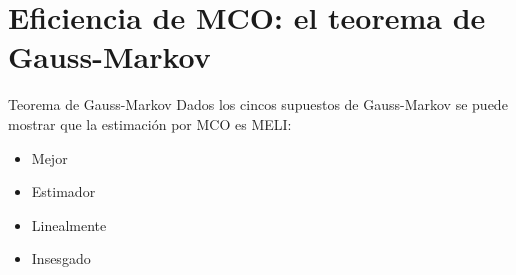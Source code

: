 \section{Eficiencia de MCO: el teorema de Gauss-Markov}
\begin{frame}{Teorema de Gauss-Markov} 
	Dados los cincos supuestos de Gauss-Markov se puede mostrar que la estimación por MCO es MELI:
	\begin{itemize}
		\item Mejor
		\item Estimador
		\item Linealmente 
		\item Insesgado
	\end{itemize}
\end{frame}